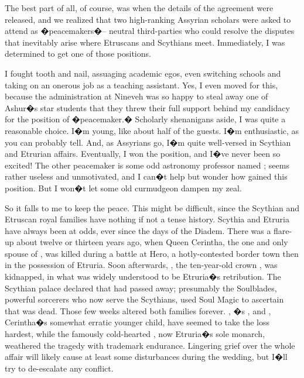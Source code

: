 \documentclass[char]{Kos}
\begin{document}
The best part of all, of course, was when the details of the agreement were released, and we realized that two high-ranking Assyrian scholars were asked to attend as �peacemakers�-- neutral third-parties who could resolve the disputes that inevitably arise where Etruscans and Scythians meet. Immediately, I was determined to get one of those positions.

I fought tooth and nail, assuaging academic egos, even switching schools and taking on an onerous job as a teaching assistant. Yes, I even moved for this, because the administration at Nineveh was so happy to steal away one of Ashur�s star students that they threw their full support behind my candidacy for the position of �peacemaker.� Scholarly shenanigans aside, I was quite a reasonable choice. I�m young, like about half of the guests. I�m enthusiastic, as you can probably tell. And, as Assyrians go, I�m quite well-versed in Scythian and Etrurian affairs. Eventually, I won the position, and I�ve never been so excited! The other peacemaker is some odd astronomy professor named \cAnarchist{\name}; \cAnarchist{\they} seems rather useless and unmotivated, and I can�t help but wonder how \cAnarchist{\they} gained this position. But I won�t let some old curmudgeon dampen my zeal.

So it falls to me to keep the peace. This might be difficult, since the Scythian and Etruscan royal families have nothing if not a tense history. Scythia and Etruria have always been at odds, ever since the days of the Diadem. There was a flare-up about twelve or thirteen years ago, when Queen Cerintha, the one and only spouse of \cKingOne{\name}, was killed during a battle at Hero, a hotly-contested border town then in the possession of Etruria. Soon afterwards, \cFugitive{\name}, the ten-year-old crown \cFugitive{\prince}, was kidnapped, in what was widely understood to be Etruria�s retribution. The Scythian palace declared that \cFugitive{\nickname} had passed away; presumably the Soulblades, powerful sorcerers who now serve the Scythians, used Soul Magic to ascertain that \cFugitive{\they} was dead. Those few weeks altered both families forever. \cQueenTwo{\nickname}, \cFugitive{\name}�s \cQueenTwo{\parent}, and \cPoet{\nickname}, Cerintha�s somewhat erratic younger child, have seemed to take the loss hardest, while the famously cold-hearted \cKingOne{\name}, now Etruria�s sole monarch, weathered the tragedy with \cKingOne{\their} trademark endurance. Lingering grief over the whole affair will likely cause at least some disturbances during the wedding, but I�ll try to de-escalate any conflict.
\end{document}
